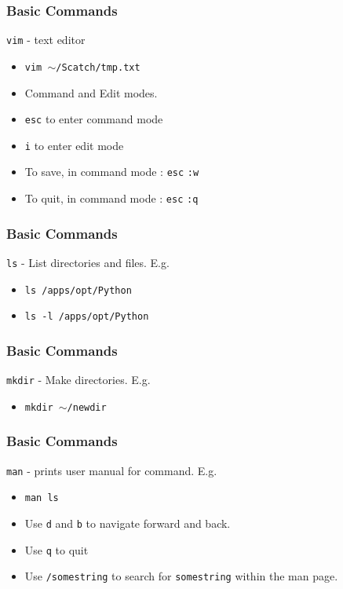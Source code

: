 \documentclass{beamer}
\newcommand{\code}[1]{\colorbox{codegray}{\texttt{#1}}}
\begin{document}
\begin{frame}
\frametitle{Basic Commands}
\code{vim} - text editor
\bigskip
\begin{itemize}
    \item \code{vim $\sim$/Scatch/tmp.txt}
    \bigskip
    \pause
    \item Command and Edit modes.
    \bigskip
    \item \code{esc} to enter command mode
    \pause
    \bigskip
    \item \code{i} to enter edit mode
    \pause
    \bigskip
    \item To save, in command mode : \code{esc} \code{:w}
    \pause
    \bigskip
    \item To quit, in command mode : \code{esc} \code{:q}
    \pause
\end{itemize}
\end{frame}


\begin{frame}
\frametitle{Basic Commands}
\code{ls} - List directories and files. E.g.
\bigskip
\begin{itemize}
    \item \code{ls /apps/opt/Python}
    \bigskip
    \pause
    \item \code{ls -l /apps/opt/Python} 
\end{itemize}
\end{frame}



\begin{frame}
\frametitle{Basic Commands}
\code{mkdir} - Make directories. E.g.
\bigskip
\begin{itemize}
    \item \code{mkdir $\sim$/newdir}
\end{itemize}
\end{frame}


\begin{frame}
\frametitle{Basic Commands}
\code{man} - prints user manual for command. E.g.
\bigskip
\begin{itemize}
    \item \code{man ls}
    \pause
    \bigskip
    \item Use \code{d} and \code{b} to navigate forward and back.
    \pause
    \bigskip
    \item Use \code{q} to quit
    \pause
    \bigskip
    \item Use \code{/somestring} to search for \code{somestring} within the man page.
    \pause
\end{itemize}
\end{frame}
\end{document}
